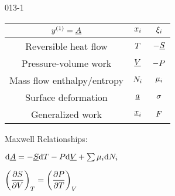 \begin{mitframe}{013-1}  %

    

\begin{longtable}{ | c | c | c | } 
 \hline
 	$ y^{(1)}= \uline{\helmholtz}$& $\conjcoor$ & $\conjcoortwo_{\state}$ \\ \hline
	Reversible heat flow & $\Temp$ & $-\uline{\entropy}$ \\ \hline 
	Pressure-volume work & $\uline{\vol}$ & $-\p$  \\ \hline
 	Mass flow enthalpy/entropy& $\nummoles_{\state}$ & $\chempot_{\state}$ \\ \hline   
	Surface deformation & $\totalsa$ & $\surftens$ \\ \hline   
    Generalized work & $\gendisp_{\state}$ & $\force$ \\ \hline
 
 
\end{longtable}

    
    
\begin{listone}
        
    \item Maxwell Relationships:
        
    \item $\mathrm{d}\uline{\helmholtz} = -\uline{\entropy}\mathrm{d}\Temp - \p\mathrm{d}\uline{\vol} + \sum\nolimits\chempot_{\state}\mathrm{d}\nummoles_{\state}$
         
    \item $\bigg(\dfrac{\partial\entropy}{\partial\vol}\bigg)_{\Temp} = \bigg(\dfrac{\partial\p}{\partial\Temp}\bigg)_{\vol}$
    
\end{listone}			

\end{mitframe}